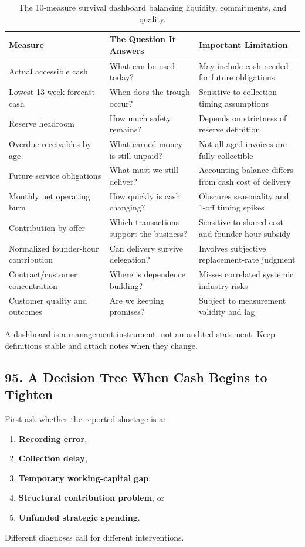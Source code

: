 \begin{table}[htbp]
\centering
\small
\begin{tabularx}{\textwidth}{p{4.2cm}p{5.5cm}X}
\toprule
\textbf{Measure} & \textbf{The Question It Answers} & \textbf{Important Limitation} \\
\midrule
Actual accessible cash & What can be used today? & May include cash needed for future obligations \\
Lowest 13-week forecast cash & When does the trough occur? & Sensitive to collection timing assumptions \\
Reserve headroom & How much safety remains? & Depends on strictness of reserve definition \\
Overdue receivables by age & What earned money is still unpaid? & Not all aged invoices are fully collectible \\
Future service obligations & What must we still deliver? & Accounting balance differs from cash cost of delivery \\
Monthly net operating burn & How quickly is cash changing? & Obscures seasonality and 1-off timing spikes \\
Contribution by offer & Which transactions support the business? & Sensitive to shared cost and founder-hour subsidy \\
Normalized founder-hour contribution & Can delivery survive delegation? & Involves subjective replacement-rate judgment \\
Contract/customer concentration & Where is dependence building? & Misses correlated systemic industry risks \\
Customer quality and outcomes & Are we keeping promises? & Subject to measurement validity and lag \\
\bottomrule
\end{tabularx}
\caption{The 10-measure survival dashboard balancing liquidity, commitments, and quality.}
\end{table}

A dashboard is a management instrument, not an audited statement. Keep definitions stable and attach notes when they change.

\subsection*{95. A Decision Tree When Cash Begins to Tighten}

First ask whether the reported shortage is a:
\begin{enumerate}
\item \textbf{Recording error},
\item \textbf{Collection delay},
\item \textbf{Temporary working-capital gap},
\item \textbf{Structural contribution problem}, or
\item \textbf{Unfunded strategic spending}.
\end{enumerate}
Different diagnoses call for different interventions.

